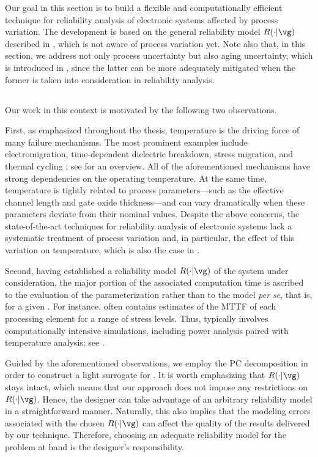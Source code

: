 Our goal in this section is to build a flexible and computationally efficient
technique for reliability analysis of electronic systems affected by process
variation. The development is based on the general reliability model $R(\cdot |
\vg)$ described in , which is not aware of process
variation yet. Note also that, in this section, we address not only process
uncertainty but also aging uncertainty, which is introduced in
, since the latter can be more adequately mitigated when
the former is taken into consideration in reliability analysis.

\subsection{\problemtitle}

Our work in this context is motivated by the following two observations.

First, as emphasized throughout the thesis, temperature is the driving force of
many failure mechanisms. The most prominent examples include electromigration,
time-dependent dielectric breakdown, stress migration, and thermal cycling
\cite{xiang2010}; see \cite{jedec2016} for an overview. All of the
aforementioned mechanisms have strong dependencies on the operating temperature.
At the same time, temperature is tightly related to process parameters---such as
the effective channel length and gate oxide thickness---and can vary
dramatically when these parameters deviate from their nominal values. Despite
the above concerns, the state-of-the-art techniques for reliability analysis of
electronic systems lack a systematic treatment of process variation and, in
particular, the effect of this variation on temperature, which is also the case
in .

Second, having established a reliability model $R(\cdot | \vg)$ of the system
under consideration, the major portion of the associated computation time is
ascribed to the evaluation of the parameterization \vg rather than to the model
\emph{per se}, that is, for a given \vg. For instance, \vg often contains
estimates of the \ac{MTTF} of each processing element for a range of stress
levels. Thus, \vg typically involves computationally intensive simulations,
including power analysis paired with temperature analysis; see
.

Guided by the aforementioned observations, we employ the \ac{PC} decomposition
in order to construct a light surrogate for \vg. It is worth emphasizing that
$R(\cdot | \vg)$ stays intact, which means that our approach does not impose any
restrictions on $R(\cdot | \vg)$. Hence, the designer can take advantage of an
arbitrary reliability model in a straightforward manner. Naturally, this also
implies that the modeling errors associated with the chosen $R(\cdot | \vg)$ can
affect the quality of the results delivered by our technique. Therefore,
choosing an adequate reliability model for the problem at hand is the designer's
responsibility.

